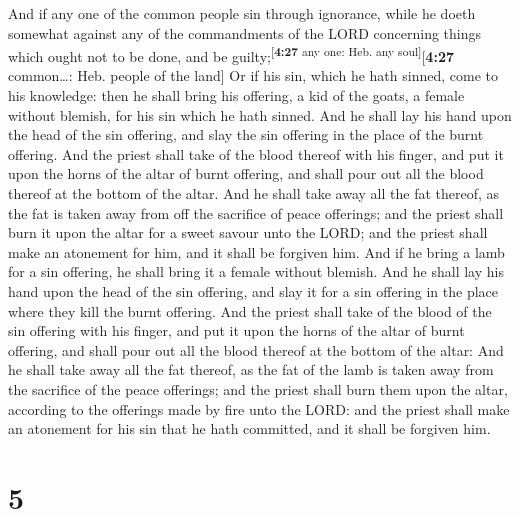  And if any one of the common people sin through
ignorance, while he doeth somewhat against any of the commandments of
the LORD concerning things which ought not to be done, and be
guilty;\textsuperscript{{[}\textbf{4:27} any one: Heb. any
soul{]}}{[}\textbf{4:27} common\ldots: Heb. people of the land{]}
 Or if his sin, which he hath sinned, come to his
knowledge: then he shall bring his offering, a kid of the goats, a
female without blemish, for his sin which he hath sinned.
 And he shall lay his hand upon the head of the sin
offering, and slay the sin offering in the place of the burnt offering.
 And the priest shall take of the blood thereof with his
finger, and put it upon the horns of the altar of burnt offering, and
shall pour out all the blood thereof at the bottom of the altar.
 And he shall take away all the fat thereof, as the fat
is taken away from off the sacrifice of peace offerings; and the priest
shall burn it upon the altar for a sweet savour unto the LORD; and the
priest shall make an atonement for him, and it shall be forgiven him.
 And if he bring a lamb for a sin offering, he shall
bring it a female without blemish.  And he shall lay his
hand upon the head of the sin offering, and slay it for a sin offering
in the place where they kill the burnt offering.  And the
priest shall take of the blood of the sin offering with his finger, and
put it upon the horns of the altar of burnt offering, and shall pour out
all the blood thereof at the bottom of the altar:  And he
shall take away all the fat thereof, as the fat of the lamb is taken
away from the sacrifice of the peace offerings; and the priest shall
burn them upon the altar, according to the offerings made by fire unto
the LORD: and the priest shall make an atonement for his sin that he
hath committed, and it shall be forgiven him.

\hypertarget{section-4}{%
\section{5}\label{section-4}}

